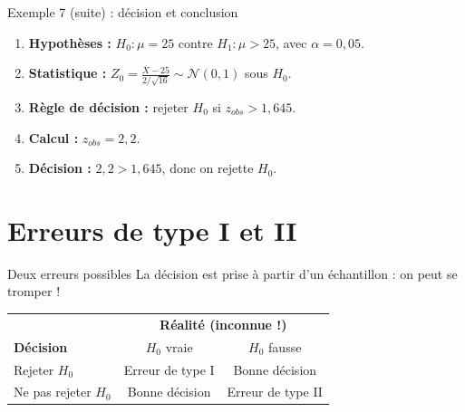\documentclass{BeamerTemplate}
\begin{document}
\begin{frame}[t]{Exemple 7 (suite) : décision et conclusion}
  \begin{enumerate}\itemsep 3mm
    \item \textbf{Hypothèses :} $H_0 : \mu = 25$ contre $H_1 : \mu > 25$, avec $\alpha = 0{,}05$.
    \item \textbf{Statistique :} $Z_0 = \frac{\overline{X} - 25}{2/\sqrt{16}} \sim \mathcal{N}(0,1)$ sous $H_0$.
    \item \textbf{Règle de décision :} rejeter $H_0$ si $z_{obs} > 1{,}645$.
    \item<2-> \textbf{Calcul :} $z_{obs} = 2{,}2$.
    \item<3-> \textbf{Décision :} $2{,}2 > 1{,}645$, donc on \alert{rejette $H_0$}.
  \end{enumerate}

\end{frame}

\section{Erreurs de type I et II}

\begin{frame}[t]{Deux erreurs possibles}
  La décision est prise à partir d'un échantillon : on peut se tromper !

  \medskip
  \centering
  \renewcommand{\arraystretch}{1.5}
  \begin{tabular}{l|cc}
    & \multicolumn{2}{c}{\textbf{Réalité (inconnue !)}} \\
    \textbf{Décision} & $H_0$ vraie & $H_0$ fausse \\ \hline
    Rejeter $H_0$ & \alert{Erreur de type I} & Bonne décision \\
    Ne pas rejeter $H_0$ & Bonne décision & \alert{Erreur de type II} \\
  \end{tabular}

  \raggedright
  \medskip
\end{frame}
\end{document}
